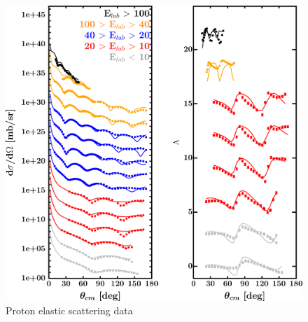 \label{ca48DOMOutput}
\begin{figure}[H]
    \centering
    \begin{minipage}{0.45\textwidth}
        \centering
        \includegraphics[width=1.0\textwidth]{figures/ca48_protonElastic.png}
        \caption{Proton elastic scattering data}
        \label{DOMFitData_ca48_proton_elastic}
    \end{minipage}\hfill
    \begin{minipage}{0.45\textwidth}
        \centering

\end{minipage}
\end{figure}
